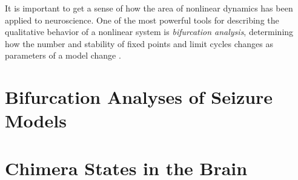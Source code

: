 It is important to get a sense of how the area of nonlinear dynamics has been applied to neuroscience.
One of the most powerful tools for describing the qualitative behavior of a nonlinear system is \textit{bifurcation analysis}, determining how the number and stability of fixed points and limit cycles changes as parameters of a model change \cite{Strogatz2015}.
\section{Bifurcation Analyses of Seizure Models}
\label{sec:lit_review_bifurcation}



\section{Chimera States in the Brain}
\label{sec:lit_review_chimera}

